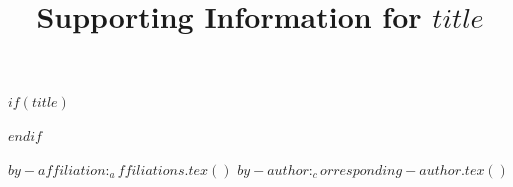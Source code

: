 $if(title)$
\title{Supporting Information for $title$}
$endif$

$by-affiliation:_affiliations.tex()$
$by-author:_corresponding-author.tex()$





